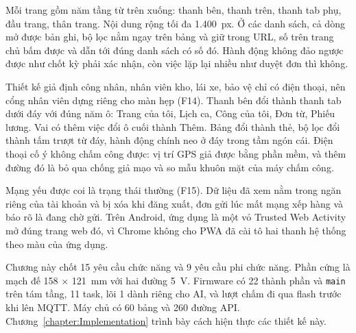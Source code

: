 \documentclass[../DoAn.tex]{subfiles}
\begin{document}
Mỗi trang gồm năm tầng từ trên xuống: thanh bên, thanh trên, thanh tab phụ, đầu trang, thân trang. Nội dung
rộng tối đa 1.400~px. Ở các danh sách, cả dòng mở được bản ghi, bộ lọc nằm ngay trên bảng và giữ trong URL,
số trên trang chủ bấm được và dẫn tới đúng danh sách có số đó. Hành động không đảo ngược được như chốt kỳ
phải xác nhận, còn việc lặp lại nhiều như duyệt đơn thì không.

Thiết kế giả định công nhân, nhân viên kho, lái xe, bảo vệ chỉ có điện thoại, nên cổng nhân viên dựng riêng
cho màn hẹp (F14). Thanh bên đổi thành thanh tab dưới đáy với đúng năm ô: Trang của tôi, Lịch ca, Công của tôi,
Đơn từ, Phiếu lương. Vai có thêm việc đổi ô cuối thành Thêm. Bảng đổi thành thẻ, bộ lọc đổi thành tấm trượt từ đáy, hành động chính neo ở đáy trong tầm ngón
cái. Điện thoại cố ý không chấm công được: vị trí GPS giả được bằng phần mềm, và thêm đường đó là bỏ qua chống
giả mạo và so mẫu khuôn mặt của máy chấm công.

Mạng yếu được coi là trạng thái thường (F15). Dữ liệu đã xem nằm trong ngăn riêng của tài khoản và
bị xóa khi đăng xuất, đơn gửi lúc mất mạng xếp hàng và báo rõ là đang chờ gửi. Trên Android, ứng
dụng là một vỏ Trusted Web Activity~\cite{twa} mở đúng trang web đó, vì Chrome không cho PWA đã cài
tô hai thanh hệ thống theo màu của ứng dụng.

Chương này chốt 15 yêu cầu chức năng và 9 yêu cầu phi chức năng. Phần cứng là mạch đế 158 $\times$ 121~mm với
hai đường 5~V. Firmware có 22 thành phần và \texttt{main} trên tám tầng, 11 task, lõi 1 dành riêng cho AI, và
lượt chấm đi qua flash trước khi lên MQTT. Máy chủ có 60 bảng và 260 đường API.
Chương~\ref{chapter:Implementation} trình bày cách hiện thực các thiết kế này.
\end{document}

